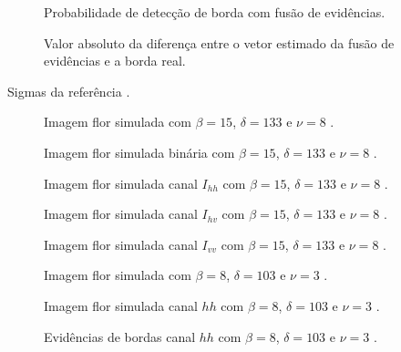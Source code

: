 \begin{figure}[hbt]
	\caption{Probabilidade de detecção de borda com fusão de evidências.}
\label{cap_acf_fig13}
\endminipage\hfill
{}
	\caption{Valor absoluto da diferença entre o vetor estimado da fusão de evidências e a borda real.}
\label{cap_acf_fig14}
\endminipage\hfill
\end{figure}
Sigmas da referência \citet{nhfc}.
\begin{figure}[hbt]
	\caption{Imagem flor simulada com $\beta = 15$, $\delta = 133$ e $\nu = 8$ .}
\label{cap_acf_fig15}
\endminipage\hfill
{}
	\caption{Imagem flor simulada binária com $\beta = 15$, $\delta = 133$ e $\nu = 8$ .}
\label{cap_acf_fig16}
\endminipage\hfill
\end{figure}
\begin{figure}[hbt]
	\caption{Imagem flor simulada canal $I_{hh}$ com $\beta = 15$, $\delta = 133$ e $\nu = 8$ .}
\endminipage\hfill
{}
	\caption{Imagem flor simulada canal $I_{hv}$ com $\beta = 15$, $\delta = 133$ e $\nu = 8$ .}
\endminipage\hfill
\centering
{}
	\caption{Imagem flor simulada canal $I_{vv}$ com $\beta = 15$, $\delta = 133$ e $\nu = 8$ .}
\endminipage\hfill
\end{figure}
\begin{figure}[hbt]
	\caption{Imagem flor simulada com $\beta = 8$, $\delta = 103$ e $\nu = 3$ .}
\label{cap_acf_fig15}
\end{figure}
\begin{figure}[hbt]
	\caption{Imagem flor simulada canal $hh$ com $\beta = 8$, $\delta = 103$ e $\nu = 3$ .}
\label{cap_acf_fig15}
\endminipage\hfill
{}
	\caption{Evidências de bordas canal $hh$ com $\beta = 8$, $\delta = 103$ e $\nu = 3$ .}
\label{cap_acf_fig16}
\endminipage\hfill
\end{figure}
